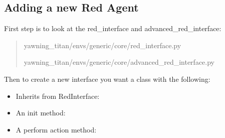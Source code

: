 \documentclass[letterpaper,10pt,english]{sphinxmanual}
\begin{document}
\subsection{Adding a new Red Agent}
\label{\detokenize{source/enhancing_yawning_titan:adding-a-new-red-agent}}
\sphinxAtStartPar
First step is to look at the red\_interface and advanced\_red\_interface:
\begin{quote}

\sphinxAtStartPar
yawning\_titan/envs/generic/core/red\_interface.py

\sphinxAtStartPar
yawning\_titan/envs/generic/core/advanced\_red\_interface.py
\end{quote}

\sphinxAtStartPar
Then to create a new interface you want a class with the following:
\begin{itemize}
\item {}
\sphinxAtStartPar
Inherits from RedInterface:

\begin{sphinxVerbatim}[commandchars=\\\{\}]
 
\end{sphinxVerbatim}

\item {}
\sphinxAtStartPar
An init method:

\begin{sphinxVerbatim}[commandchars=\\\{\}]
  
\end{sphinxVerbatim}

\item {}
\sphinxAtStartPar
A perform action method:

\begin{sphinxVerbatim}[commandchars=\\\{\}]
   \PYG{p}{[} \PYG{p}{[} \PYG{p}{[}\PYG{p}{]}\PYG{p}{]} \PYG{p}{[}\PYG{p}{[}\PYG{p}{]} \PYG{p}{]} \PYG{p}{[}\PYG{p}{[}\PYG{p}{]} \PYG{p}{]} \PYG{p}{[}\PYG{p}{[}\PYG{p}{]} \PYG{p}{[}\PYG{p}{]}\PYG{p}{]}\PYG{p}{]}
\end{sphinxVerbatim}

\end{itemize}
\end{document}

